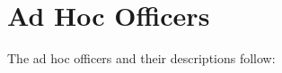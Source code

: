 %
%
%

\section{Ad Hoc Officers}\label{sec:AdHocOfficers} The ad hoc officers and their descriptions follow:\\


